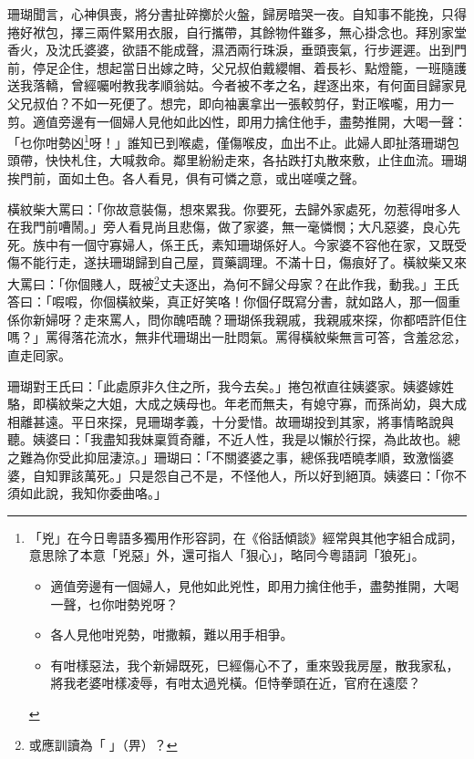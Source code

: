 \documentclass[a5paper, 12pt, openany]{book} %
\begin{document}
	珊瑚聞言，心神俱喪，將分書扯碎擲於火盤，歸房暗哭一夜。自知事不能挽，只得捲好袱包，擇三兩件緊用衣服，自行攜帶，其餘物件雖多，無心掛念也。拜別家堂香火，及沈氏婆婆，欲語不能成聲，濕洒兩行珠淚，垂頭喪氣，行步遲遲。出到門前，停足企住，想起當日出嫁之時，父兄叔伯戴纓帽、着長衫、點燈籠，一班隨護送我落轎，曾經囑咐教我孝順翁姑。今者被不孝之名，趕逐出來，有何面目歸家見父兄叔伯？不如一死便了。想完，即向袖裏拿出一張較剪仔，對正喉嚨，用力一剪。適值旁邊有一個婦人見他如此凶性，即用力擒住他手，盡勢推開，大喝一聲：「乜你咁勢凶\footnote{
  「兇」在今日粵語多獨用作形容詞，在《俗話傾談》經常與其他字組合成詞，意思除了本意「兇惡」外，還可指人「狠心」，略同今粵語詞「狼死」。
  \begin{itemize}[itemsep=0pt, parsep=0pt]
    \item 適值旁邊有一個婦人，見他如此兇性，即用力擒住他手，盡勢推開，大喝一聲，乜你咁勢兇呀？
    \item 各人見他咁兇勢，咁撒賴，難以用手相爭。 
    \item 有咁樣惡法，我个新婦既死，巳經傷心不了，重來毁我房屋，散我家私，將我老婆咁樣凌辱，有咁太過兇橫。佢恃拳頭在近，官府在遠麼？
  \end{itemize}
  }呀！」誰知已到喉處，僅傷喉皮，血出不止。此婦人即扯落珊瑚包頭帶，快快札住，大喊救命。鄰里紛紛走來，各拈跌打丸散來敷，止住血流。珊瑚挨門前，面如土色。各人看見，俱有可憐之意，或出嗟嘆之聲。

	橫紋柴大罵曰：「你故意裝傷，想來累我。你要死，去歸外家處死，勿惹得咁多人在我門前嘈鬧。」旁人看見尚且悲傷，做了家婆，無一毫憐憫；大凡惡婆，良心先死。族中有一個守寡婦人，係王氏，素知珊瑚係好人。今家婆不容他在家，又既受傷不能行走，遂扶珊瑚歸到自己屋，買藥調理。不滿十日，傷痕好了。橫紋柴又來大罵曰：「你個賤人，既被\footnote{或應訓讀為「󰉡」（畀）？}丈夫逐出，為何不歸父母家？在此作我，動我。」王氏答曰：「㗇㗇，你個橫紋柴，真正好笑咯！你個仔既寫分書，就如路人，那一個重係你新婦呀？走來罵人，問你醜唔醜？珊瑚係我親戚，我親戚來探，你都唔許佢住嗎？」罵得落花流水，無非代珊瑚出一肚悶氣。罵得橫紋柴無言可答，含羞忿忿，直走囘家。

	珊瑚對王氏曰：「此處原非久住之所，我今去矣。」捲包袱直往姨婆家。姨婆嫁姓駱，即橫紋柴之大姐，大成之姨母也。年老而無夫，有媳守寡，而孫尚幼，與大成相離甚遠。平日來探，見珊瑚孝義，十分愛惜。故珊瑚投到其家，將事情略說與聽。姨婆曰：「我盡知我妹稟質奇離，不近人性，我是以懶於行探，為此故也。總之難為你受此抑屈淒涼。」珊瑚曰：「不關婆婆之事，總係我唔曉孝順，致激惱婆婆，自知罪該萬死。」只是怨自己不是，不怪他人，所以好到絕頂。姨婆曰：「你不須如此說，我知你委曲咯。」
\end{document}
